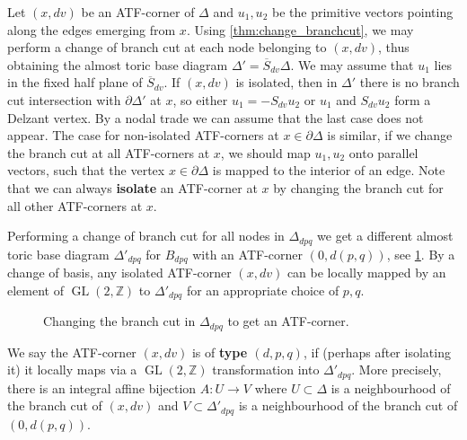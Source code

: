 \documentclass[AIF,Unicode,manuscript]{cedram}
\DeclareMathOperator{\GL}{GL}
\begin{document}
Let $(x,dv)$ be an ATF-corner of $Δ$ and $u_1,u_2$ be the primitive vectors pointing along the edges emerging from $x$.
Using \cref{thm:change_branchcut}, we may perform a change of branch cut at each node belonging to $(x,dv)$, thus obtaining the almost toric base diagram $Δ' = \overline{S}_{dv}Δ$.
We may assume that $u_1$ lies in the fixed half plane of $\overline{S}_{dv}$.
If $(x,dv)$ is isolated, then in $Δ'$ there is no branch cut intersection with $∂Δ'$ at $x$, so either $u_1 = -S_{dv}u_2$ or $u_1$ and $S_{dv}u_2$ form a Delzant vertex.
By a nodal trade we can assume that the last case does not appear.
The case for non-isolated ATF-corners at $x ∈ ∂Δ$ is similar, if we change the branch cut at all ATF-corners at $x$, we should map $u_1,u_2$ onto parallel vectors, such that the vertex $x ∈ ∂Δ$ is mapped to the interior of an edge.
Note that we can always \textbf{isolate} an ATF-corner at $x$ by changing the branch cut for all other ATF-corners at $x$.

Performing a change of branch cut for all nodes in $Δ_{dpq}$ we get a different almost toric base diagram $Δ'_{dpq}$ for $B_{dpq}$ with an ATF-corner $(0,d(p,q))$, see \cref{fig:Bdpq_moment_image_alt}.
By a change of basis, any isolated ATF-corner $(x,dv)$ can be locally mapped by an element of $\GL(2,ℤ)$ to $Δ'_{dpq}$ for an appropriate choice of $p,q$.

\begin{figure}
\centering
{}   
\caption{Changing the branch cut in $Δ_{dpq}$ to get an ATF-corner.}
\label{fig:Bdpq_moment_image_alt}
\end{figure}

\begin{definition}
  \label{def:atf_corner_type}
  We say the ATF-corner $(x,dv)$ is of \textbf{type $(d,p,q)$}, if (perhaps after isolating it) it locally maps via a $\GL(2,ℤ)$ transformation into $Δ'_{dpq}$. More precisely, there is an integral affine bijection $A\colon U → V$ where $U ⊂ Δ$ is a neighbourhood of the branch cut of $(x,dv)$ and $V ⊂ Δ'_{dpq}$ is a neighbourhood of the branch cut of $(0,d(p,q))$.
\end{definition}
\end{document}

